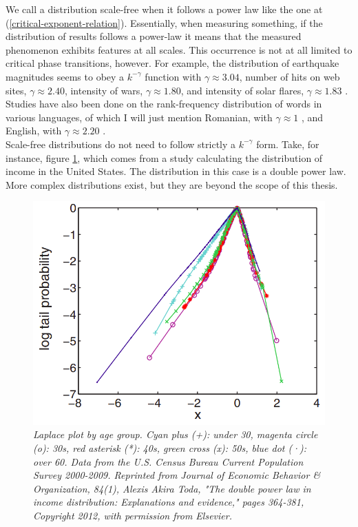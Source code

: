\documentclass[12pt,openright,twoside]{book}
\begin{document}
We call a distribution scale-free when it follows a power law like the one at (\ref{critical-exponent-relation}). Essentially, when measuring something, if the distribution of results follows a power-law it means that the measured phenomenon exhibits features at all scales. This occurrence is not at all limited to critical phase transitions, however\cite{pinto_lopes_machado_2012}. For example, the distribution of earthquake magnitudes seems to obey a $k^{-\gamma}$ function with $\gamma\approx3.04$, number of hits on web sites, $\gamma\approx2.40$, intensity of wars, $\gamma\approx1.80$, and intensity of solar flares, $\gamma\approx1.83$ \cite{newman_2005}. Studies have also been done on the rank-frequency distribution of words in various languages, of which I will just mention Romanian, with $\gamma\approx1$ \cite{cocioceanu_raportaru_nicolin_jakimovski_2017}, and English, with $\gamma\approx2.20$ \cite{newman_2005}.\\

Scale-free distributions do not need to follow strictly a $k^{-\gamma}$ form. Take, for instance, figure \ref{power-law-distribs}, which comes from a study calculating the distribution of income in the United States\cite{toda_2012}. The distribution in this case is a double power law. More complex distributions exist, but they are beyond the scope of this thesis.\\

\begin{figure}[!htb]
\centering
\includegraphics[width=0.65\linewidth]{figures/income_distribution.png}
\caption{\textit{{\small Laplace plot by age group. Cyan plus (+): under 30, magenta circle (o): 30s, red asterisk (*): 40s, green cross (x): 50s, blue dot (·): over 60. Data from the U.S. Census Bureau Current Population Survey 2000-2009. Reprinted from Journal of Economic Behavior \& Organization, 84(1), Alexis Akira Toda, "The double power law in income distribution: Explanations and evidence," pages 364-381, Copyright 2012, with permission from Elsevier.}}}
\label{power-law-distribs}
\end{figure}
\end{document}
